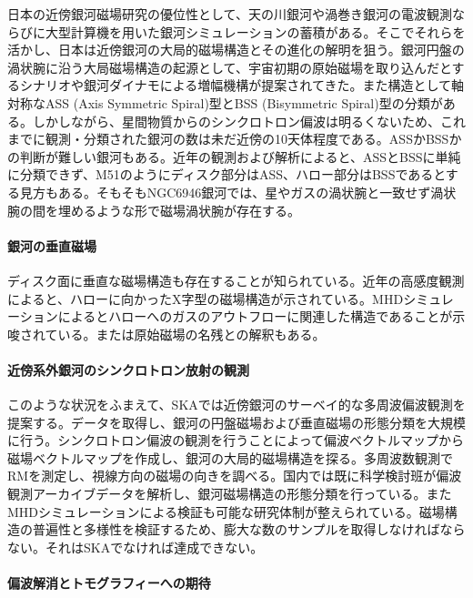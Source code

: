 日本の近傍銀河磁場研究の優位性として、天の川銀河や渦巻き銀河の電波観測ならびに大型計算機を用いた銀河シミュレーションの蓄積がある。そこでそれらを活かし、日本は近傍銀河の大局的磁場構造とその進化の解明を狙う。銀河円盤の渦状腕に沿う大局磁場構造の起源として、宇宙初期の原始磁場を取り込んだとするシナリオ\citep{2010PASJ...62.1191S}や銀河ダイナモによる増幅機構\citep{1986ARA&A..24..459S}が提案されてきた。また構造として軸対称なASS (Axis Symmetric Spiral)型とBSS (Bisymmetric Spiral)型の分類がある\citep{1986ARA&A..24..459S}。しかしながら、星間物質からのシンクロトロン偏波は明るくないため、これまでに観測・分類された銀河の数は未だ近傍の10天体程度である。ASSかBSSかの判断が難しい銀河もある。近年の観測および解析によると、ASSとBSSに単純に分類できず、M51のようにディスク部分はASS、ハロー部分はBSSであるとする見方もある\citep{2011MNRAS.412.2396F}。そもそもNGC6946銀河では、星やガスの渦状腕と一致せず渦状腕の間を埋めるような形で磁場渦状腕が存在する\citep{2007A&A...470..539B}。

\paragraph{銀河の垂直磁場}

ディスク面に垂直な磁場構造も存在することが知られている。近年の高感度観測によると、ハローに向かったX字型の磁場構造が示されている\citep{2013A&A...560A..42M}。MHDシミュレーションによるとハローへのガスのアウトフローに関連した構造であることが示唆されている\citep{2013MNRAS.432..176P}。または原始磁場の名残との解釈もある\citep{2010PASJ...62.1191S}。

\paragraph{近傍系外銀河のシンクロトロン放射の観測}

このような状況をふまえて、SKAでは近傍銀河のサーベイ的な多周波偏波観測を提案する。データを取得し、銀河の円盤磁場および垂直磁場の形態分類を大規模に行う。シンクロトロン偏波の観測を行うことによって偏波ベクトルマップから磁場ベクトルマップを作成し、銀河の大局的磁場構造を探る。多周波数観測でRMを測定し、視線方向の磁場の向きを調べる。国内では既に科学検討班が偏波観測アーカイブデータを解析し、銀河磁場構造の形態分類を行っている。またMHDシミュレーションによる検証も可能な研究体制が整えられている。磁場構造の普遍性と多様性を検証するため、膨大な数のサンプルを取得しなければならない。それはSKAでなければ達成できない。

\paragraph{偏波解消とトモグラフィーへの期待}

